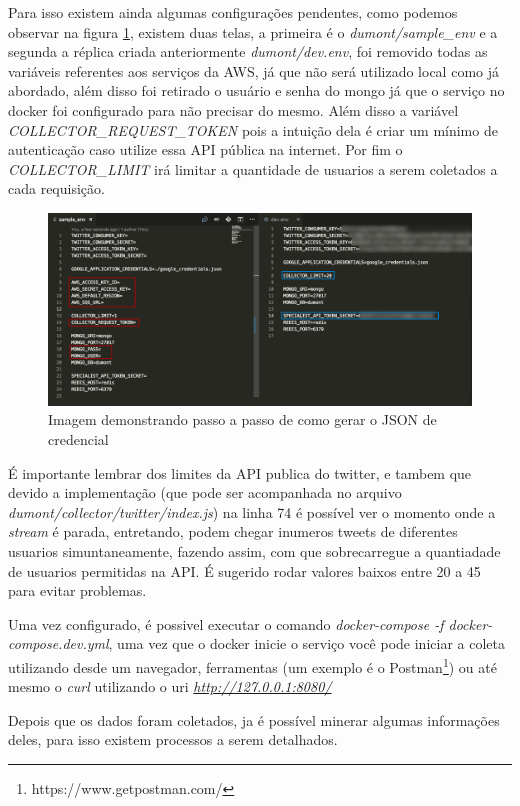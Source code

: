 Para isso existem ainda algumas configurações pendentes, como podemos observar na figura \ref{fig:creds}, existem duas telas, a primeira é o \textit{dumont/sample\_env} e a segunda a réplica criada anteriormente \textit{dumont/dev.env}, foi removido todas as variáveis referentes aos serviços da AWS, já que não será utilizado local como já abordado, além disso foi retirado o usuário e senha do mongo já que o serviço no docker foi configurado para não precisar do mesmo. Além disso a variável \textit{COLLECTOR\_REQUEST\_TOKEN} pois a intuição dela é criar um mínimo de autenticação caso utilize essa API pública na internet. Por fim o \textit{COLLECTOR\_LIMIT} irá limitar a quantidade de usuarios a serem coletados a cada requisição.

\begin{figure}
    \centering
    \includegraphics[width=1\textwidth]{imagens/creds.png}
    \caption{Imagem demonstrando passo a passo de como gerar o JSON de credencial}
    \label{fig:creds}
\end{figure}

É importante lembrar dos limites da API publica do twitter, e tambem que devido a implementação (que pode ser acompanhada no arquivo \textit{dumont/collector/twitter/index.js}) na linha 74 é possível ver o momento onde a \textit{stream} é parada, entretando, podem chegar inumeros tweets de diferentes usuarios simuntaneamente, fazendo assim, com que sobrecarregue a quantiadade de usuarios permitidas na API. É sugerido rodar valores baixos entre 20 a 45 para evitar problemas.

Uma vez configurado, é possivel executar o comando \textit{docker-compose -f docker-compose.dev.yml}, uma vez que o docker inicie o serviço você pode iniciar a coleta utilizando desde um navegador, ferramentas (um exemplo é o Postman\footnote{https://www.getpostman.com/}) ou até mesmo o \textit{curl} utilizando o uri \textit{\url{http://127.0.0.1:8080/}}

Depois que os dados foram coletados, ja é possível minerar algumas informações deles, para isso existem processos a serem detalhados.